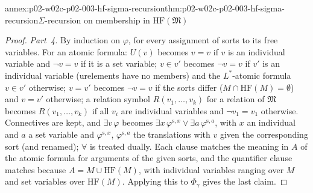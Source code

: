 \begin{annexitem}{annex:p02-w02c-p02-003-hf-sigma-recursion}{thm:p02-w02c-p02-003-hf-sigma-recursion}{\(\Sigma\)-recursion on membership in \(\mathrm{HF}(\mathfrak M)\)}
\begin{proof}
\emph{Part~4.}  By induction on \(\varphi\), for every assignment of
sorts to its free variables.  For an atomic formula: \(U(v)\) becomes
\(v=v\) if \(v\) is an individual variable and \(\neg v=v\) if it is a
set variable; \(v\in v'\) becomes \(\neg v=v\) if \(v'\) is an individual
variable (urelements have no members) and the \(L^{*}\)-atomic formula
\(v\in v'\) otherwise; \(v=v'\) becomes \(\neg v=v\) if the sorts differ
(\(M\cap\mathrm{HF}(M)=\emptyset\)) and \(v=v'\) otherwise; a relation
symbol \(R(v_1,\ldots,v_k)\) for a relation of \(\mathfrak M\) becomes
\(R(v_1,\ldots,v_k)\) if all \(v_i\) are individual variables and \(\neg
v_1=v_1\) otherwise.  Connectives are kept, and \(\exists v\,\varphi\)
becomes \(\exists x\,\varphi^{\mathrm s,x}\lor\exists
a\,\varphi^{\mathrm s,a}\), with \(x\) an individual and \(a\) a set
variable and \(\varphi^{\mathrm s,x}\), \(\varphi^{\mathrm s,a}\) the
translations with \(v\) given the corresponding sort (and renamed);
\(\forall\) is treated dually.  Each clause matches the meaning in \(A\)
of the atomic formula for arguments of the given sorts, and the
quantifier clause matches because \(A=M\cup\mathrm{HF}(M)\), with
individual variables ranging over \(M\) and set variables over
\(\mathrm{HF}(M)\).  Applying this to \(\Phi_\gamma\) gives the last claim.
\end{proof}
\end{annexitem}

